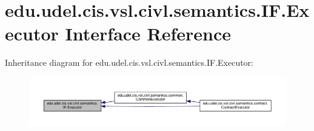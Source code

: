 \hypertarget{interfaceedu_1_1udel_1_1cis_1_1vsl_1_1civl_1_1semantics_1_1IF_1_1Executor}{}\section{edu.\+udel.\+cis.\+vsl.\+civl.\+semantics.\+I\+F.\+Executor Interface Reference}
\label{interfaceedu_1_1udel_1_1cis_1_1vsl_1_1civl_1_1semantics_1_1IF_1_1Executor}


Inheritance diagram for edu.\+udel.\+cis.\+vsl.\+civl.\+semantics.\+I\+F.\+Executor\+:
\nopagebreak
\begin{figure}[H]
\begin{center}
\leavevmode
\includegraphics[width=350pt]{interfaceedu_1_1udel_1_1cis_1_1vsl_1_1civl_1_1semantics_1_1IF_1_1Executor__inherit__graph}
\end{center}
\end{figure}
